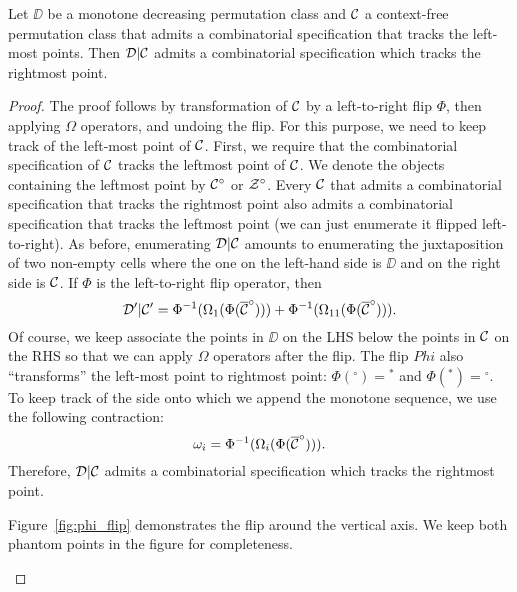 \documentclass[12pt, a4paper, twoside]{report}
\begin{document}
\begin{proposition}
  \label{prop:leftappend}
Let $\DD$ be a monotone decreasing permutation class and $\mathcal{C}$ a context-free permutation class that admits a combinatorial specification that tracks the left-most points. Then $\mathcal{D}|\mathcal{C}$ admits a combinatorial specification which tracks the rightmost point.
\end{proposition}
\begin{proof}
The proof follows by transformation of $\mathcal{C}$ by a left-to-right flip $\Phi$, then applying $\Omega$ operators, and undoing the flip. For this purpose, we need to keep track of the left-most point of $\mathcal{C}$. First, we require that the combinatorial specification of $\mathcal{C}$ tracks the leftmost point of $\mathcal{C}$. We denote the objects containing the leftmost point by $\mathcal{C}^\circ$ or $\mathcal{Z}^\circ$. Every $\mathcal{C}$ that admits a combinatorial specification that tracks the rightmost point also admits a combinatorial specification that tracks the leftmost point (we can just enumerate it flipped left-to-right). As before, enumerating $\mathcal{D}|\mathcal{C}$ amounts to enumerating the juxtaposition of two non-empty cells where the one on the left-hand side is $\DD$ and on the right side is $\mathcal{C}$. If $\Phi$ is the left-to-right flip operator, then 
$$\mathcal{D}'|\mathcal{C}' = \Phi^{-1}(\Omega_1(\Phi(\overline{\mathcal{C}}^\circ))) + \Phi^{-1}(\Omega_{11}(\Phi(\overline{\mathcal{C}}^\circ))).$$
Of course, we keep associate the points in $\DD$ on the LHS below the points in $\mathcal{C}$ on the RHS so that we can apply $\Omega$ operators after the flip. The flip $Phi$ also ``transforms'' the left-most point to rightmost point: $\Phi({}^\circ) = {}^*$ and $\Phi({}^*) = {}^\circ$. To keep track of the side onto which we append the monotone sequence, we use the following contraction:
$$ \omega_i = \Phi^{-1}(\Omega_i(\Phi(\overline{\mathcal{C}}^\circ))).$$
Therefore, $\mathcal{D}|\mathcal{C}$ admits a combinatorial specification which tracks the rightmost point.

Figure~\ref{fig:phi_flip} demonstrates the flip around the vertical axis. We keep both phantom points in the figure for completeness.
\begin{figure}[!ht]
  \centering
\end{figure}
\end{proof}
\end{document}

